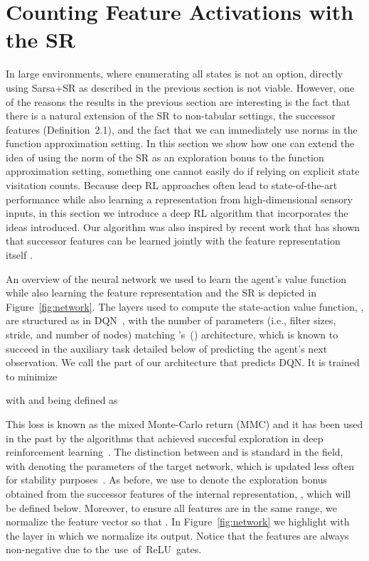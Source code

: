 \documentclass[letterpaper]{article} \usepackage{aaai20}  \usepackage{times}  \usepackage{helvet} \usepackage{courier}  \usepackage[hyphens]{url}  \usepackage{graphicx} \urlstyle{rm} \def\UrlFont{\rm}  \usepackage{graphicx}  \frenchspacing  \setlength{\pdfpagewidth}{8.5in}  \setlength{\pdfpageheight}{11in}  \usepackage{booktabs}
\begin{document}
\section{Counting Feature Activations with the SR}
\label{sec:deep_sr}

In large environments, where enumerating all states is not an option, directly using Sarsa+SR as described in the previous section is not viable. However, one of the reasons the results in the previous section are interesting is the fact that there is a natural extension of the SR to non-tabular settings, the successor features (Definition~2.1), and the fact that we can immediately use norms in the function approximation setting. In this section we show how one can extend the idea of using the norm of the SR as an exploration bonus to the function approximation setting, something one cannot easily do if relying on explicit state visitation counts. Because deep RL approaches often lead to state-of-the-art performance while also learning a representation from high-dimensional sensory inputs, in this section we introduce a deep RL algorithm that incorporates the ideas introduced. Our algorithm was also inspired by recent work that has shown that successor features can be learned jointly with the feature representation itself \cite{Kulkarni16,Machado18b}.

An overview of the neural network we used to learn the agent's value function while also learning the feature representation and the SR is depicted in Figure~\ref{fig:network}. The layers used to compute the state-action value function, , are structured as in DQN~\cite{Mnih15}, with the number of parameters (i.e., filter sizes, stride, and number of nodes) matching \citeauthor{Oh15}'s~(\citeyear{Oh15}) architecture, which is known to succeed in the auxiliary task detailed below of predicting the agent's next observation. We call the part of our architecture that predicts  DQN. It is trained to minimize

with  and  being defined as 


This loss is known as the mixed Monte-Carlo return (MMC) and it has been used in the past by the algorithms that achieved succesful exploration in deep reinforcement learning~\cite{Bellemare16,Ostrovski17}. The distinction between  and  is standard in the field, with  denoting the parameters of the target network, which is updated less often for stability purposes~\cite{Mnih15}. As before, we use  to denote the exploration bonus obtained from the successor features of the internal representation, , which will be defined below. Moreover, to ensure all features are in the same range, we normalize the feature vector so that . In Figure~\ref{fig:network} we highlight with  the layer in which we normalize its output. Notice that the features are always non-negative due to the~use~of~ReLU~gates.
\end{document}
